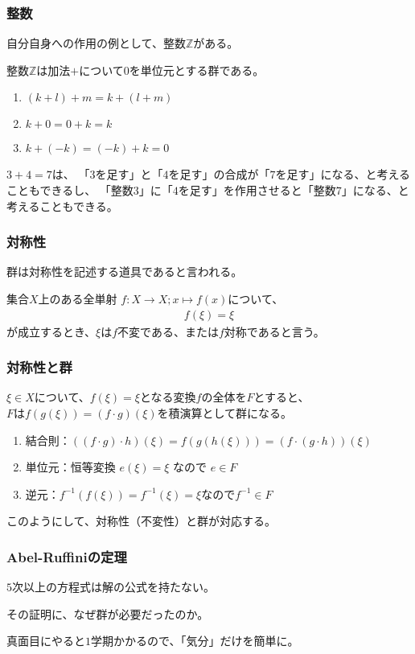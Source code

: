 \documentclass[12pt, t]{beamer}
\begin{document}
\begin{frame}
\frametitle{整数}
自分自身への作用の例として、整数$\mathbb{Z}$がある。

整数$\mathbb{Z}$は加法$+$について$0$を単位元とする群である。
\begin{enumerate}
\item $(k + l) + m = k + (l + m)$
\item $k + 0 = 0 + k = k$
\item $k + (-k) = (-k) + k = 0$
\end{enumerate}

$3 + 4 = 7$は、
「$3$を足す」と「$4$を足す」の合成が「$7$を足す」になる、と考えることもできるし、
「整数$3$」に「$4$を足す」を作用させると「整数$7$」になる、と考えることもできる。
\end{frame}

\begin{frame}
\frametitle{対称性}
群は対称性を記述する道具であると言われる。

集合$X$上のある全単射 $f: X \rightarrow X; x \mapsto f(x)$について、
\begin{align}
  f(\xi) = \xi
\end{align}
が成立するとき、$\xi$は\alert{$f$不変である}、または\alert{$f$対称である}と言う。
\end{frame}

\begin{frame}
\frametitle{対称性と群}
$\xi \in X$について、$f(\xi) = \xi$となる変換$f$の全体を$F$とすると、\\
$F$は$f(g(\xi)) = (f \cdot g)(\xi)$を積演算として群になる。

\begin{enumerate}
\item 結合則：$((f \cdot g) \cdot h)(\xi) = f(g(h(\xi))) = (f \cdot (g \cdot h))(\xi)$
\item 単位元：恒等変換 $e(\xi) = \xi$ なので $e \in F$
\item 逆元：$f^{-1}(f(\xi)) = f^{-1}(\xi) = \xi$なので$f^{-1} \in F$
\end{enumerate}

このようにして、対称性（不変性）と群が対応する。
\end{frame}


\begin{frame}
\frametitle{Abel-Ruffiniの定理}
$5$次以上の方程式は解の公式を持たない。

その証明に、なぜ群が必要だったのか。

真面目にやると$1$学期かかるので、「気分」だけを簡単に。
\end{frame}
\end{document}
